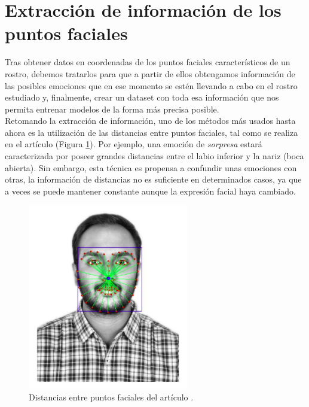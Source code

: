 \section{Extracción de información de los puntos faciales}
\label{sec:extraer_informacion}

Tras obtener datos en coordenadas de los puntos faciales característicos de un rostro, debemos tratarlos para que a partir de ellos obtengamos información de las posibles emociones que en ese momento se estén llevando a cabo en el rostro estudiado y, finalmente, crear un dataset con toda esa información que nos permita entrenar modelos de la forma más precisa posible.\\

Retomando la extracción de información, uno de los métodos más usados hasta ahora es la utilización de las distancias entre puntos faciales, tal como se realiza en el artículo \cite{dlib_emotions} (Figura \ref{fig:dlib_foto_articulo}). Por ejemplo, una emoción de \textit{sorpresa} estará caracterizada por poseer grandes distancias entre el labio inferior y la nariz (boca abierta). Sin embargo, esta técnica es propensa a confundir unas emociones con otras, la información de distancias no es suficiente en determinados casos, ya que a veces se puede mantener constante aunque la expresión facial haya cambiado.

\begin{figure} [h!]
  \begin{center}
    \includegraphics[width=7cm]{figs/dlib_foto_articulo.png}
  \end{center}
  \captionsetup{justification=centering}
  \caption{Distancias entre puntos faciales del artículo \cite{dlib_emotions}.}
  \label{fig:dlib_foto_articulo}
\end{figure}

